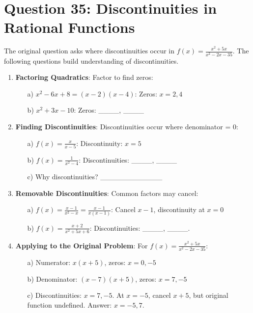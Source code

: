 \documentclass[12pt]{article}
\begin{document}
\section*{Question 35: Discontinuities in Rational Functions}
The original question asks where discontinuities occur in \( f(x) = \frac{x^2 + 5x}{x^2 - 2x - 35} \). The following questions build understanding of discontinuities.

\begin{enumerate}[label=35.\arabic*]
    \item \textbf{Factoring Quadratics}: Factor to find zeros:
    \begin{enumerate}
        \item[a)] \( x^2 - 6x + 8 = (x - 2)(x - 4) \): Zeros: \( x = 2, 4 \)
        \item[b)] \( x^2 + 3x - 10 \): Zeros: \_\_\_\_, \_\_\_\_
    \end{enumerate}
    \item \textbf{Finding Discontinuities}: Discontinuities occur where denominator = 0:
    \begin{enumerate}
        \item[a)] \( f(x) = \frac{x}{x - 5} \): Discontinuity: \( x = 5 \)
        \item[b)] \( f(x) = \frac{1}{x^2 - 4} \): Discontinuities: \_\_\_\_, \_\_\_\_
        \item[c)] Why discontinuities? \_\_\_\_\_\_\_\_\_\_\_\_
    \end{enumerate}
    \item \textbf{Removable Discontinuities}: Common factors may cancel:
    \begin{enumerate}
        \item[a)] \( f(x) = \frac{x - 1}{x^2 - x} = \frac{x - 1}{x(x - 1)} \): Cancel \( x - 1 \), discontinuity at \( x = 0 \)
        \item[b)] \( f(x) = \frac{x + 2}{x^2 + 5x + 6} \): Discontinuities: \_\_\_\_, \_\_\_\_.
    \end{enumerate}
    \item \textbf{Applying to the Original Problem}: For \( f(x) = \frac{x^2 + 5x}{x^2 - 2x - 35} \):
    \begin{enumerate}
        \item[a)] Numerator: \( x(x + 5) \), zeros: \( x = 0, -5 \)
        \item[b)] Denominator: \( (x - 7)(x + 5) \), zeros: \( x = 7, -5 \)
        \item[c)] Discontinuities: \( x = 7, -5 \). At \( x = -5 \), cancel \( x + 5 \), but original function undefined. Answer: \( x = -5, 7 \).
    \end{enumerate}
\end{enumerate}
\end{document}
